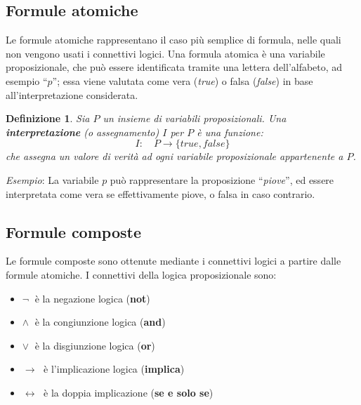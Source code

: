 \documentclass[a4paper,12pt]{report}
\newcommand{\tto} {\leftrightarrow}
\newtheorem{definition}{Definizione}[section]
\begin{document}
\subsection{Formule atomiche}
Le formule atomiche rappresentano il caso più semplice di formula, nelle quali non vengono usati i connettivi logici. Una formula atomica è una variabile proposizionale, che può essere identificata tramite una lettera dell'alfabeto, ad esempio ``$p$''; essa viene valutata come vera (\emph{true}) o falsa (\emph{false}) in base all'interpretazione considerata. 

\begin{definition}
    Sia $P$ un insieme di variabili proposizionali. Una \textbf{interpretazione} (o assegnamento) $I$ per $P$ è una funzione:
    \[
        I: \quad P \to \{true, false\}
    \]
    che assegna un valore di verità ad ogni variabile proposizionale appartenente a $P$.
\end{definition}
\emph{Esempio}: La variabile $p$ può rappresentare la proposizione ``\emph{piove}'', ed essere interpretata come vera se effettivamente piove, o falsa in caso contrario.

\subsection{Formule composte}
Le formule composte sono ottenute mediante i connettivi logici a partire dalle formule atomiche. I connettivi della logica proposizionale sono:
\begin{itemize}
    \item $\lnot \;$ è la negazione logica (\textbf{not})
    \item $\land \;$ è la congiunzione logica (\textbf{and})
    \item $\lor \;$ è la disgiunzione logica (\textbf{or})
    \item $\to\;$ è l'implicazione logica (\textbf{implica})
    \item $\tto\;$ è la doppia implicazione (\textbf{se e solo se})
\end{itemize}
\end{document}
